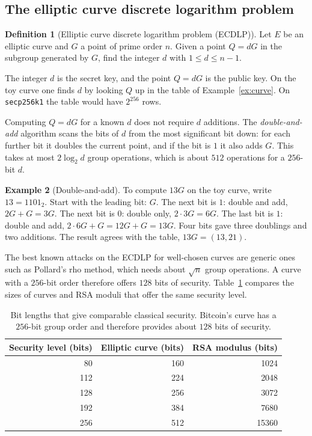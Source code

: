 \documentclass[11pt,a4paper]{article}
\theoremstyle{definition}
\newtheorem{definition}{Definition}[section]
\newtheorem{example}[definition]{Example}
\begin{document}
\subsection{The elliptic curve discrete logarithm problem}

\begin{definition}[Elliptic curve discrete logarithm problem (ECDLP)]
Let $E$ be an elliptic curve and $G$ a point of prime order $n$. Given a point $Q=dG$ in the subgroup generated by $G$, find the integer $d$ with $1\le d\le n-1$.
\end{definition}

The integer $d$ is the secret key, and the point $Q=dG$ is the public key. On the toy curve one finds $d$ by looking $Q$ up in the table of Example~\ref{ex:curve}. On \texttt{secp256k1} the table would have $2^{256}$ rows.

Computing $Q=dG$ for a known $d$ does not require $d$ additions. The \emph{double-and-add} algorithm scans the bits of $d$ from the most significant bit down: for each further bit it doubles the current point, and if the bit is $1$ it also adds $G$. This takes at most $2\log_2 d$ group operations, which is about $512$ operations for a $256$-bit $d$.

\begin{example}[Double-and-add]\label{ex:dbl}
To compute $13G$ on the toy curve, write $13=1101_2$. Start with the leading bit: $G$. The next bit is $1$: double and add, $2G+G=3G$. The next bit is $0$: double only, $2\cdot 3G=6G$. The last bit is $1$: double and add, $2\cdot 6G+G=12G+G=13G$. Four bits gave three doublings and two additions. The result agrees with the table, $13G=(13,21)$.
\end{example}

The best known attacks on the ECDLP for well-chosen curves are generic ones such as Pollard's rho method, which needs about $\sqrt n$ group operations. A curve with a $256$-bit order therefore offers $128$ bits of security. Table~\ref{tab:keysizes} compares the sizes of curves and RSA moduli that offer the same security level.

\begin{table}[h]
\centering
\begin{tabular}{rrr}
\toprule
Security level (bits) & Elliptic curve (bits) & RSA modulus (bits)\\
\midrule
80 & 160 & 1024\\
112 & 224 & 2048\\
128 & 256 & 3072\\
192 & 384 & 7680\\
256 & 512 & 15360\\
\bottomrule
\end{tabular}
\caption{Bit lengths that give comparable classical security. Bitcoin's curve has a $256$-bit group order and therefore provides about $128$ bits of security.}\label{tab:keysizes}
\end{table}
\end{document}
